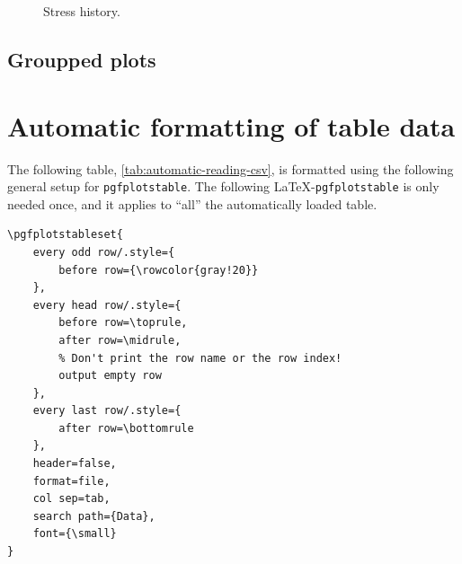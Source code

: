 \begin{TeXlstlisting}
\begin{figure}[h]
	\centering
	\caption{Stress history.}
	\label{fig:stress-evolution}
\end{figure}
\end{TeXlstlisting}

\subsection{Groupped plots}


\section{Automatic formatting of table data} \label{sec:pgfplotstable}

The following table, \cref{tab:automatic-reading-csv}, is formatted using the following general setup for \verb|pgfplotstable|. The following \LaTeX-\verb|pgfplotstable| is only needed once, and it applies to ``all'' the automatically loaded table.

\begin{lstlisting}[language={[LaTeX]TeX}]
% Configure the general setting of pgfplotstable
\pgfplotstableset{
	every odd row/.style={
		before row={\rowcolor{gray!20}}
	},
	every head row/.style={
		before row=\toprule,
		after row=\midrule,
		% Don't print the row name or the row index!
		output empty row
	},
	every last row/.style={
		after row=\bottomrule
	},
	header=false,
	format=file,
	col sep=tab,
	search path={Data},
	font={\small}
}
\end{lstlisting}

